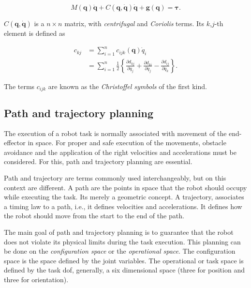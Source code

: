 \begin{equation}
    \label{eq:equations_motion}
    M(\boldsymbol{q})\ddot{\boldsymbol{q}} + C(\boldsymbol{q}, \dot{\boldsymbol{q}})\dot{\boldsymbol{q}} + \boldsymbol{g}(\boldsymbol{q}) = \boldsymbol{\tau}.
\end{equation}

$C(\boldsymbol{q}, \dot{\boldsymbol{q}})$ is a $n \times n$ matrix, with \emph{centrifugal} and \emph{Coriolis} terms. Its $k$,$j$-th element is defined as

\begin{align}
    c_{kj} &= \sum^n_{i=1} c_{ijk}(\boldsymbol{q})\dot{q}_i \\
    &= \sum^n_{i=1} \frac{1}{2} \left\{ \frac{\partial d_{kj}}{\partial q_j} + \frac{\partial d_{ki}}{\partial q_j} - \frac{\partial d_{ij}}{\partial q_k} \right\}.
\end{align}

The terms $c_{ijk}$ are known as the \emph{Christoffel symbols} of the first kind.


\subsection{Path and trajectory planning}
\label{subsec:path_trajectory_planning}

The execution of a robot task is normally associated with movement of the end-effector in space. For proper and safe execution of the movements, obstacle avoidance and the application of the right velocities and accelerations must be considered. For this, path and trajectory planning are essential.

Path and trajectory are terms commonly used interchangeably, but on this context are different. A path are the points in space that the robot should occupy while executing the task. Its merely a geometric concept. A trajectory, associates a timing law to a path, i.e., it defines velocities and accelerations. It defines how the robot should move from the start to the end of the path.

The main goal of path and trajectory planning is to guarantee that the robot does not violate its physical limits during the task execution. This planning can be done on the \emph{configuration space} or the \emph{operational space}. The configuration space is the space defined by the joint variables. The operational or task space is defined by the task \gls{dof}, generally, a six dimensional space (three for position and three for orientation).

